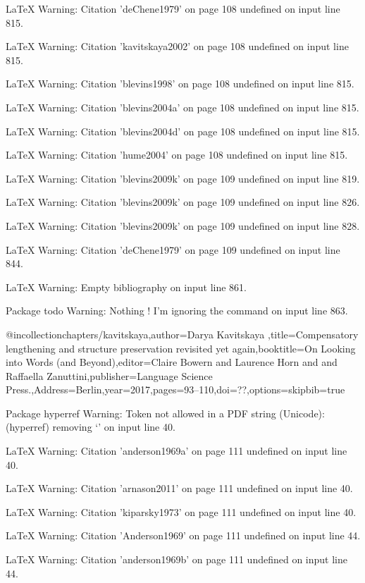 LaTeX Warning: Citation 'deChene1979' on page 108 undefined on input line 815.


LaTeX Warning: Citation 'kavitskaya2002' on page 108 undefined on input line 815.


LaTeX Warning: Citation 'blevins1998' on page 108 undefined on input line 815.


LaTeX Warning: Citation 'blevins2004a' on page 108 undefined on input line 815.


LaTeX Warning: Citation 'blevins2004d' on page 108 undefined on input line 815.


LaTeX Warning: Citation 'hume2004' on page 108 undefined on input line 815.


LaTeX Warning: Citation 'blevins2009k' on page 109 undefined on input line 819.


LaTeX Warning: Citation 'blevins2009k' on page 109 undefined on input line 826.


LaTeX Warning: Citation 'blevins2009k' on page 109 undefined on input line 828.


LaTeX Warning: Citation 'deChene1979' on page 109 undefined on input line 844.


LaTeX Warning: Empty bibliography on input line 861.


Package todo Warning: Nothing \todo! I'm ignoring the \todos command on input line 863.

@incollection{chapters/kavitskaya,author={Darya Kavitskaya },title={{Compensatory lengthening and structure preservation revisited yet again}},booktitle={{On Looking into Words (and Beyond)}},editor={Claire Bowern and  Laurence Horn and  and Raffaella Zanuttini},publisher={Language Science Press.},Address={Berlin},year=2017,pages={93--110},doi={??},options={skipbib=true}}

Package hyperref Warning: Token not allowed in a PDF string (Unicode):
(hyperref)                removing `\newline' on input line 40.


LaTeX Warning: Citation 'anderson1969a' on page 111 undefined on input line 40.


LaTeX Warning: Citation 'arnason2011' on page 111 undefined on input line 40.


LaTeX Warning: Citation 'kiparsky1973' on page 111 undefined on input line 40.


LaTeX Warning: Citation 'Anderson1969' on page 111 undefined on input line 44.


LaTeX Warning: Citation 'anderson1969b' on page 111 undefined on input line 44.


